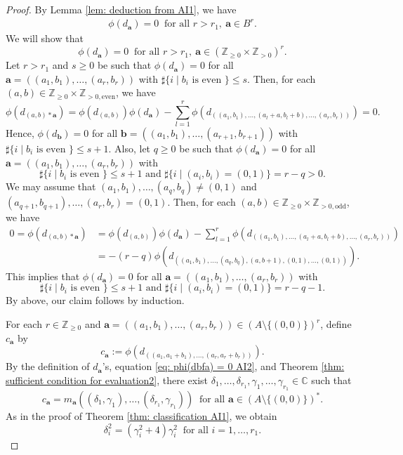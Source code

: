 \documentclass[12pt,a4paper]{amsart}
\theoremstyle{definition}
\numberwithin{equation}{subsection}
\begin{document}
\begin{proof}
  By Lemma \ref{lem: deduction from AI1}, we have
  \begin{align}\label{eq: phi(dbfa) = 0 AI2}
    \phi(d_\mathbf{a}) = 0 \ \text{ for all } r > r_1,\ \mathbf{a} \in B^r.
  \end{align}
  We will show that
  \[
    \phi(d_\mathbf{a}) = 0 \ \text{ for all } r > r_1,\ \mathbf{a} \in (\mathbb{Z}_{\geq 0} \times \mathbb{Z}_{> 0})^r.
  \]
  Let $r > r_1$ and $s \geq 0$ be such that $\phi(d_\mathbf{a}) = 0$ for all $\mathbf{a} = ((a_1,b_1),\dots,(a_r,b_r))$ with $\sharp\{i \mid \text{$b_i$ is even }\} \leq s$.
  Then, for each $(a,b) \in \mathbb{Z}_{\geq 0} \times \mathbb{Z}_{> 0,\mathrm{even}}$, we have
  \[
    \phi(d_{(a,b)*\mathbf{a}}) = \phi(d_{(a,b)}) \phi(d_\mathbf{a}) - \sum_{l=1}^r \phi(d_{((a_1,b_1),\dots,(a_l+a,b_l+b),\dots,(a_r,b_r))}) = 0.
  \]
  Hence, $\phi(d_\mathbf{b}) = 0$ for all $\mathbf{b} = ((a_1,b_1),\dots,(a_{r+1},b_{r+1}))$ with $\sharp\{i \mid \text{$b_i$ is even }\} \leq s+1$.
  Also, let $q \geq 0$ be such that $\phi(d_\mathbf{a}) = 0$ for all $\mathbf{a} = ((a_1,b_1),\dots,(a_r,b_r))$ with
  \[
    \sharp\{i \mid \text{$b_i$ is even }\} \leq s+1 \text{ and } \sharp\{ i \mid (a_i,b_i) = (0,1) \} = r-q > 0.
  \]
  We may assume that $(a_1,b_1),\dots,(a_q,b_q) \neq (0,1)$ and $(a_{q+1},b_{q+1}),\dots,(a_r,b_r) = (0,1)$.
  Then, for each $(a,b) \in \mathbb{Z}_{\geq 0} \times \mathbb{Z}_{> 0,\mathrm{odd}}$, we have
  \begin{align*}
    0 = \phi(d_{(a,b)*\mathbf{a}}) &= \phi(d_{(a,b)}) \phi(d_\mathbf{a}) - \sum_{l=1}^r \phi(d_{((a_1,b_1),\dots,(a_l+a,b_l+b),\dots,(a_r,b_r))})\\
    &= -(r-q)\phi(d_{((a_1,b_1),\dots,(a_q,b_q),(a,b+1),(0,1),\dots,(0,1))}).
  \end{align*}
  This implies that $\phi(d_\mathbf{a}) = 0$ for all $\mathbf{a} = ((a_1,b_1),\dots,(a_r,b_r))$ with
  \[
    \sharp\{i \mid \text{$b_i$ is even }\} \leq s+1 \text{ and } \sharp\{ i \mid (a_i,b_i) = (0,1) \} = r-q-1.
  \]
  By above, our claim follows by induction.

  For each $r \in \mathbb{Z}_{\geq 0}$ and $\mathbf{a} = ((a_1,b_1),\dots,(a_r,b_r)) \in (A \setminus \{(0,0)\})^r$, define $c_\mathbf{a}$ by
  \[
    c_\mathbf{a} := \phi(d_{((a_1,a_1+b_1),\dots,(a_r,a_r+b_r))}).
  \]
  By the definition of $d_{\mathbf{a}}$'s, equation \eqref{eq: phi(dbfa) = 0 AI2}, and Theorem \ref{thm: sufficient condition for evaluation2}, there exist $\delta_1,\dots,\delta_{r_1},\gamma_1,\dots,\gamma_{r_1} \in \mathbb{C}$ such that
  \[
    c_\mathbf{a} = m_\mathbf{a}((\delta_1,\gamma_1),\dots,(\delta_{r_1},\gamma_{r_1})) \ \text{ for all } \mathbf{a} \in (A \setminus \{(0,0)\})^*.
  \]
  As in the proof of Theorem \ref{thm: classification AI1}, we obtain
  \[
    \delta_i^2 = (\gamma_i^2+4)\gamma_i^2 \ \text{ for all } i = 1,\dots,r_1.
  \]


\end{proof}
\end{document}
